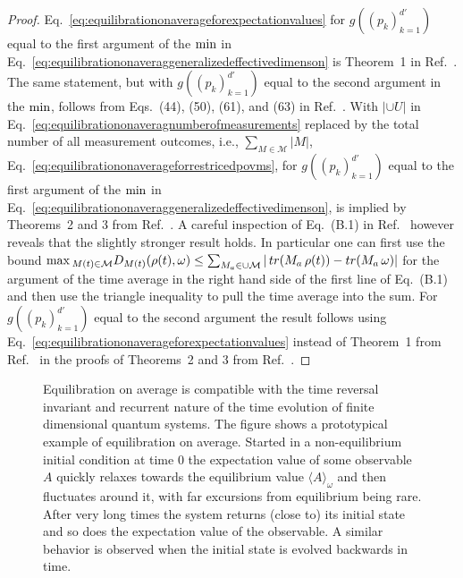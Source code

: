 \documentclass[a4paper,12pt,listof=totoc,index=totoc,bibliography=totoc,headsepline=false,headings=normal,BCOR16.153846mm,DIV12,headinclude,twoside,cleardoublepage=empty,numbers=noenddot,final]{scrreprt}
\theoremstyle{mystyle}
\numberwithin{equation}{section}
\numberwithin{figure}{section}
\numberwithin{lemma}{section}
\numberwithin{theorem}{section}
\numberwithin{corollary}{section}
\numberwithin{definition}{section}
\numberwithin{conjecture}{section}
\numberwithin{observation}{section}
\newcommand{\+}{\mkern2mu}
\newcommand{\union}{\cup}
\newcommand{\texteqref}[1]{Eq.~\eqref{#1}}
\renewcommand{\max}{\mathchoice{\operatorname*{max}}{\operatorname*{max}}{\mathrm{max}}{\mathrm{max}}} %
\renewcommand{\min}{\mathchoice{\operatorname*{min}}{\operatorname*{min}}{\mathrm{min}}{\mathrm{min}}}
\newcommand{\ex}[2]{\langle #1 \rangle_{#2}}
\DeclareMathOperator{\1}{\mathds{1}}
\newcommand{\POVMs}{\mathcal{M}}
\begin{document}
\begin{proof}
  \texteqref{eq:equilibrationonaverageforexpectationvalues} for $g((p_k)_{k=1}^{d'})$ equal to the first argument of the $\min$ in \texteqref{eq:equilibrationonaveraggeneralizedeffectivedimenson} is Theorem~1 in Ref.~\cite{1110.5759v1}.
  The same statement, but with $g((p_k)_{k=1}^{d'})$ equal to the second argument in the $\min$, follows from Eqs.~(44), (50), (61), and (63) in Ref.~\cite{Reimann12}.
  With $|{\union U}|$ in \texteqref{eq:equilibrationonaveragnumberofmeasurements} replaced by the total number of all measurement outcomes, i.e., $\sum_{M \in \POVMs} |M|$, \texteqref{eq:equilibrationonaverageforrestricedpovms}, for $g((p_k)_{k=1}^{d'})$ equal to the first argument of the $\min$ in \texteqref{eq:equilibrationonaveraggeneralizedeffectivedimenson}, is implied by Theorems~2 and 3 from Ref.~\cite{1110.5759v1}.
  A careful inspection of Eq.~(B.1) in Ref.~\cite{1110.5759v1} however reveals that the slightly stronger result holds.
  In particular one can first use the bound $\max_{M(t) \in \mathcal{M}} D_{M(t)}(\rho(t),\omega) \leq \sum_{M_a \in \union \mathcal{M}} |\mathop{tr}(M_a\,\rho(t)) - \mathop{tr}(M_a\,\omega)|$ for the argument of the time average in the right hand side of the first line of Eq.~(B.1) and then use the triangle inequality to pull the time average into the sum.
  For $g((p_k)_{k=1}^{d'})$ equal to the second argument the result follows using \texteqref{eq:equilibrationonaverageforexpectationvalues} instead of Theorem~1 from Ref.~\cite{1110.5759v1} in the proofs of Theorems~2 and 3 from Ref.~\cite{1110.5759v1}.
\end{proof}


\begin{figure}[bt]
  \centering
  \caption{Equilibration on average is compatible with the time reversal invariant and recurrent nature of the time evolution of finite dimensional quantum systems. The figure shows a prototypical example of equilibration on average. Started in a non-equilibrium initial condition at time $0$ the expectation value of some observable $A$ quickly relaxes towards the equilibrium value $\ex A \omega$ and then fluctuates around it, with far excursions from equilibrium being rare. After very long times the system returns (close to) its initial state and so does the expectation value of the observable. A similar behavior is observed when the initial state is evolved backwards in time.}
  \label{fig:equilibrationonaverage}
\end{figure}
\end{document}
